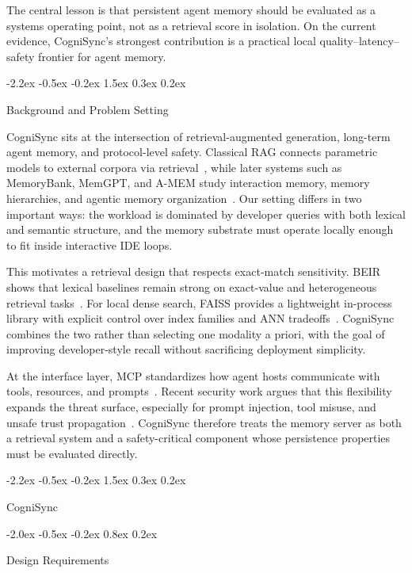 \documentclass{article}
\makeatletter
\renewcommand{\section}{%
  \@startsection{section}{1}{\z@}%
                {-2.2ex \@plus -0.5ex \@minus -0.2ex}%
                { 1.5ex \@plus  0.3ex \@minus  0.2ex}%
                {\large\bf\raggedright}%
}
\renewcommand{\subsection}{%
  \@startsection{subsection}{2}{\z@}%
                {-2.0ex \@plus -0.5ex \@minus -0.2ex}%
                { 0.8ex \@plus  0.2ex}%
                {\normalsize\bf\raggedright}%
}
\makeatother
\begin{document}
The central lesson is that persistent agent memory should be evaluated as a systems operating point, not as a retrieval score in isolation. On the current evidence, CogniSync's strongest contribution is a practical local quality--latency--safety frontier for agent memory.

\section{Background and Problem Setting}

CogniSync sits at the intersection of retrieval-augmented generation, long-term agent memory, and protocol-level safety. Classical RAG connects parametric models to external corpora via retrieval~\cite{lewis-rag}, while later systems such as MemoryBank, MemGPT, and A-MEM study interaction memory, memory hierarchies, and agentic memory organization~\cite{memorybank,memgpt,amem}. Our setting differs in two important ways: the workload is dominated by developer queries with both lexical and semantic structure, and the memory substrate must operate locally enough to fit inside interactive IDE loops.

This motivates a retrieval design that respects exact-match sensitivity. BEIR shows that lexical baselines remain strong on exact-value and heterogeneous retrieval tasks~\cite{beir}. For local dense search, FAISS provides a lightweight in-process library with explicit control over index families and ANN tradeoffs~\cite{faiss,ann-benchmarks}. CogniSync combines the two rather than selecting one modality a priori, with the goal of improving developer-style recall without sacrificing deployment simplicity.

At the interface layer, MCP standardizes how agent hosts communicate with tools, resources, and prompts~\cite{mcp-spec}. Recent security work argues that this flexibility expands the threat surface, especially for prompt injection, tool misuse, and unsafe trust propagation~\cite{mcp-security,mcpsecbench}. CogniSync therefore treats the memory server as both a retrieval system and a safety-critical component whose persistence properties must be evaluated directly.

\section{CogniSync}

\subsection{Design Requirements}
\end{document}
